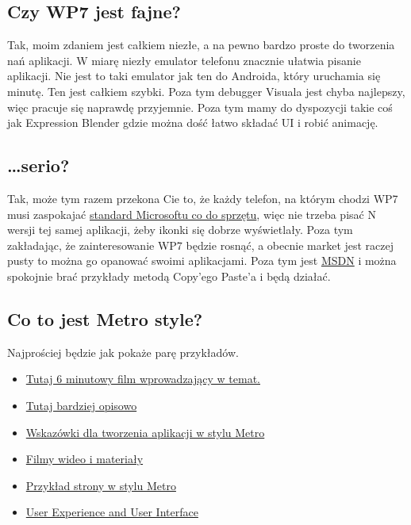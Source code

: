 \documentclass[12pt, a4paper]{article}
\begin{document}
\subsection{Czy WP7 jest fajne?}
Tak, moim zdaniem jest całkiem niezłe, a na pewno bardzo proste do tworzenia nań
aplikacji. W miarę niezły emulator telefonu znacznie ułatwia pisanie aplikacji.
Nie jest to taki emulator jak ten do Androida, który uruchamia się minutę. Ten
jest całkiem szybki. Poza tym debugger Visuala jest chyba najlepszy, więc
pracuje się naprawdę przyjemnie. Poza tym mamy do dyspozycji takie coś jak
Expression Blender gdzie można dość łatwo składać UI i robić animację.
\subsection{\ldots serio?}
Tak, może tym razem przekona Cie to, że każdy telefon, na którym chodzi WP7 musi
zaspokajać
\href{http://msdn.microsoft.com/en-us/library/ff637514%28v=vs.92%29.aspx}{standard
 Microsoftu co do sprzętu}, więc nie trzeba pisać N wersji tej samej aplikacji,
 żeby ikonki się dobrze wyświetlały. Poza tym zakładając, że
zainteresowanie WP7 będzie rosnąć, a obecnie market jest raczej pusty to można
go opanować swoimi aplikacjami. Poza tym jest
\href{http://msdn.microsoft.com/en-us/library/ff402535%28v=vs.92%29}{MSDN} i
 można spokojnie brać przykłady metodą Copy'ego Paste'a i będą działać.

\pagebreak

\subsection{Co to jest Metro style?}
Najprościej będzie jak pokaże parę przykładów.
\begin{itemize}
   \item
	\href{http://msdn.microsoft.com/en-us/library/windows/apps/hh464920.aspx}{Tutaj 6 minutowy film wprowadzający w temat.} 
	\item
	\href{http://msdn.microsoft.com/en-us/library/windows/apps/hh974576.aspx}{Tutaj bardziej opisowo}
	\item
	\href{http://msdn.microsoft.com/en-us/library/windows/apps/hh465424.aspx}{Wskazówki
	dla tworzenia aplikacji w stylu Metro}
	\item
	\href{http://www.microsoft.com/design/toolbox/tutorials/windows-phone-7/metro/}{Filmy
	wideo i materiały}
	\item \href{http://windows.github.com/}{Przykład strony w stylu Metro}
	\item \href{http://create.msdn.com/en-US/education/basics/ux_ui}{User
	Experience and User Interface}
\end{itemize}
\end{document}
